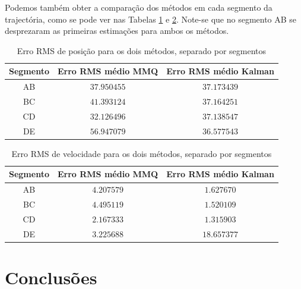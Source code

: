 \documentclass[palatino]{ist-report}
\begin{document}
Podemos também obter a comparação dos métodos em cada segmento da trajectória, como se pode ver nas Tabelas \ref{tab:something3} e \ref{tab:something4}. Note-se que no segmento AB se desprezaram as primeiras estimações para ambos os métodos.

\begin{table}[ht]
    \centering
    \begin{tabular}{c c c}\toprule
        \textbf{Segmento} & \textbf{Erro RMS médio MMQ} &\textbf{Erro RMS médio Kalman}\\
        \midrule
        AB & $37.950455$ & $37.173439$\\
        BC & $41.393124$ & $37.164251$ \\
        CD & $32.126496$ & $37.138547$ \\
        DE & $56.947079$ & $36.577543$\\
        \bottomrule
    \end{tabular}
    \caption{Erro RMS de posição para os dois métodos, separado por segmentos}
    \label{tab:something3}
\end{table}

\begin{table}[h]
    \centering
    \begin{tabular}{c c c}\toprule
        \textbf{Segmento} & \textbf{Erro RMS médio MMQ} &\textbf{Erro RMS médio Kalman}\\
        \midrule
        AB & $4.207579$ & $1.627670$\\
        BC & $4.495119$ & $1.520109 $ \\
        CD & $2.167333$ & $1.315903 $ \\
        DE & $3.225688$ & $18.657377 $ \\
        \bottomrule
    \end{tabular}
    \caption{Erro RMS de velocidade para os dois métodos, separado por segmentos}
    \label{tab:something4}
\end{table}

\FloatBarrier


\section{Conclusões}
\end{document}
